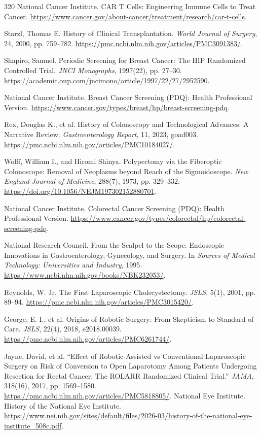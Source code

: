 \documentclass[12pt,oneside]{book}
\begin{document}
\begin{thebibliography}{320}
National Cancer Institute. CAR T Cells: Engineering Immune Cells to Treat
Cancer.
\url{https://www.cancer.gov/about-cancer/treatment/research/car-t-cells}.

Starzl, Thomas E. History of Clinical Transplantation.
\emph{World Journal of Surgery}, 24, 2000, pp. 759--782.
\url{https://pmc.ncbi.nlm.nih.gov/articles/PMC3091383/}.

Shapiro, Samuel. Periodic Screening for Breast Cancer: The HIP Randomized
Controlled Trial. \emph{JNCI Monographs}, 1997(22), pp. 27--30.
\url{https://academic.oup.com/jncimono/article/1997/22/27/2952590}.

National Cancer Institute. Breast Cancer Screening (PDQ): Health Professional
Version.
\url{https://www.cancer.gov/types/breast/hp/breast-screening-pdq}.

Rex, Douglas K., et al. History of Colonoscopy and Technological Advances: A
Narrative Review. \emph{Gastroenterology Report}, 11, 2023, goad003.
\url{https://pmc.ncbi.nlm.nih.gov/articles/PMC10184027/}.

Wolff, William I., and Hiromi Shinya. Polypectomy via the Fiberoptic
Colonoscope: Removal of Neoplasms beyond Reach of the Sigmoidoscope.
\emph{New England Journal of Medicine}, 288(7), 1973, pp. 329--332.
\url{https://doi.org/10.1056/NEJM197302152880701}.

National Cancer Institute. Colorectal Cancer Screening (PDQ): Health
Professional Version.
\url{https://www.cancer.gov/types/colorectal/hp/colorectal-screening-pdq}.

National Research Council. From the Scalpel to the Scope: Endoscopic
Innovations in Gastroenterology, Gynecology, and Surgery. In
\emph{Sources of Medical Technology: Universities and Industry}, 1995.
\url{https://www.ncbi.nlm.nih.gov/books/NBK232053/}.

Reynolds, W. Jr. The First Laparoscopic Cholecystectomy.
\emph{JSLS}, 5(1), 2001, pp. 89--94.
\url{https://pmc.ncbi.nlm.nih.gov/articles/PMC3015420/}.

George, E. I., et al. Origins of Robotic Surgery: From Skepticism to Standard
of Care. \emph{JSLS}, 22(4), 2018, e2018.00039.
\url{https://pmc.ncbi.nlm.nih.gov/articles/PMC6261744/}.

Jayne, David, et al. ``Effect of Robotic-Assisted vs Conventional
Laparoscopic Surgery on Risk of Conversion to Open Laparotomy Among Patients
Undergoing Resection for Rectal Cancer: The ROLARR Randomized Clinical Trial.''
\emph{JAMA}, 318(16), 2017, pp. 1569--1580.
\url{https://pmc.ncbi.nlm.nih.gov/articles/PMC5818805/}.
National Eye Institute. History of the National Eye Institute.
\url{https://www.nei.nih.gov/sites/default/files/2026-03/history-of-the-national-eye-institute_508c.pdf}.


\end{thebibliography}
\end{document}
